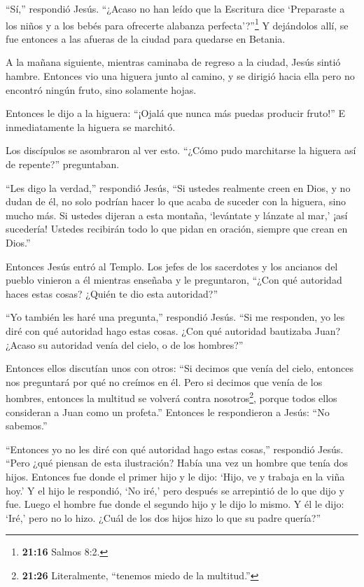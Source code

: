  ``Sí,'' respondió Jesús. ``¿Acaso no han leído que la
Escritura dice `Preparaste a los niños y a los bebés para ofrecerte
alabanza perfecta'?''\footnote{\textbf{21:16} Salmos 8:2.} 
Y dejándolos allí, se fue entonces a las afueras de la ciudad para
quedarse en Betania.

 A la mañana siguiente, mientras caminaba de regreso a la
ciudad, Jesús sintió hambre.  Entonces vio una higuera
junto al camino, y se dirigió hacia ella pero no encontró ningún fruto,
sino solamente hojas.

Entonces le dijo a la higuera: ``¡Ojalá que nunca más puedas producir
fruto!'' E inmediatamente la higuera se marchitó.

 Los discípulos se asombraron al ver esto. ``¿Cómo pudo
marchitarse la higuera así de repente?'' preguntaban.

 ``Les digo la verdad,'' respondió Jesús, ``Si ustedes
realmente creen en Dios, y no dudan de él, no solo podrían hacer lo que
acaba de suceder con la higuera, sino mucho más. Si ustedes dijeran a
esta montaña, `levántate y lánzate al mar,' ¡así sucedería!
 Ustedes recibirán todo lo que pidan en oración, siempre
que crean en Dios.''

 Entonces Jesús entró al Templo. Los jefes de los
sacerdotes y los ancianos del pueblo vinieron a él mientras enseñaba y
le preguntaron, ``¿Con qué autoridad haces estas cosas? ¿Quién te dio
esta autoridad?''

 ``Yo también les haré una pregunta,'' respondió Jesús.
``Si me responden, yo les diré con qué autoridad hago estas cosas.
 ¿Con qué autoridad bautizaba Juan? ¿Acaso su autoridad
venía del cielo, o de los hombres?''

Entonces ellos discutían unos con otros: ``Si decimos que venía del
cielo, entonces nos preguntará por qué no creímos en él. 
Pero si decimos que venía de los hombres, entonces la multitud se
volverá contra nosotros\footnote{\textbf{21:26} Literalmente, ``tenemos
  miedo de la multitud.''}, porque todos ellos consideran a Juan como un
profeta.''  Entonces le respondieron a Jesús: ``No
sabemos.''

``Entonces yo no les diré con qué autoridad hago estas cosas,''
respondió Jesús.  ``Pero ¿qué piensan de esta ilustración?
Había una vez un hombre que tenía dos hijos. Entonces fue donde el
primer hijo y le dijo: `Hijo, ve y trabaja en la viña hoy.'
 Y el hijo le respondió, `No iré,' pero después se
arrepintió de lo que dijo y fue.  Luego el hombre fue donde
el segundo hijo y le dijo lo mismo. Y él le dijo: `Iré,' pero no lo
hizo.  ¿Cuál de los dos hijos hizo lo que su padre
quería?''

